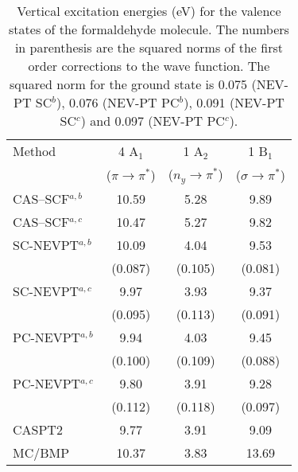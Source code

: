 \documentclass[global,referee]{svjour}
\newcommand{\pipis}{$\!\pi\!\!\rightarrow\!\! \pi^*$}
\newcommand{\sipis}{$\!\sigma\!\!\rightarrow\!\! \pi^*$}
\begin{document}
\clearpage
\newpage

\begin{table}[h]
\caption{Vertical excitation energies (eV) for the valence states of
the formaldehyde molecule.
The numbers in parenthesis are the squared norms of the first order corrections 
to the wave function. The
squared norm for the ground state is 0.075 (NEV-PT SC$^b$), 0.076 (NEV-PT PC$^b$), 
0.091 (NEV-PT SC$^c$) and 0.097 (NEV-PT PC$^c$).}
\label{Tabforeeval}
\begin{tabular}{lccc}
\hline\noalign{\smallskip}
Method &4 A$_1$ & 1 A$_2$ & 1 B$_1$ \\
 & (\pipis) & ($n_y\rightarrow\pi^*$) & (\sipis) \\
\noalign{\smallskip}\hline\noalign{\smallskip}
CAS--SCF$^{a,b}$          & 10.59  & 5.28  & 9.89  \\
CAS--SCF$^{a,c}$          & 10.47  & 5.27  & 9.82  \\
SC-NEVPT$^{a,b}$        & 10.09  & 4.04  & 9.53  \\
                        & (0.087)&(0.105)&(0.081)\\
SC-NEVPT$^{a,c}$        &  9.97  & 3.93  & 9.37  \\
                        & (0.095)&(0.113)&(0.091)\\
PC-NEVPT$^{a,b}$        &  9.94  & 4.03  & 9.45  \\
                        & (0.100)&(0.109)&(0.088)\\
PC-NEVPT$^{a,c}$        &  9.80  & 3.91  & 9.28  \\
                        & (0.112)&(0.118)&(0.097)\\
CASPT2 \cite{Merch95}   &  9.77  & 3.91  & 9.09  \\
MC/BMP \cite{Paris96}
                        & 10.37  & 3.83  &13.69  \\ 

\end{tabular}
\end{table}
\end{document}
